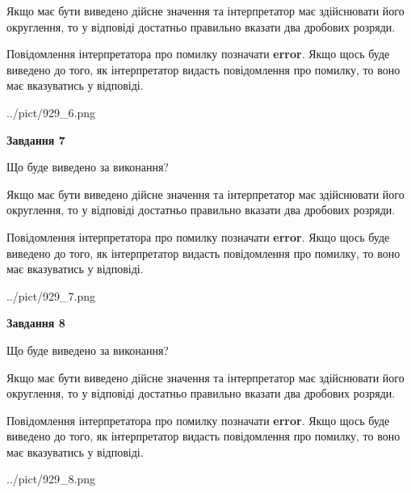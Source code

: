 \documentclass[12pt, ukrainian]{article}
\begin{document}
{\begin {Large}
Якщо має бути виведено дійсне значення та інтерпретатор має здійснювати його округлення, 
то у відповіді достатньо правильно вказати два дробових розряди.

Повідомлення інтерпретатора про помилку позначати \textbf{error}.
Якщо щось буде виведено до того, як інтерпретатор видасть повідомлення про помилку, 
то воно має вказуватись у відповіді. \par

\begin{center}
	{../pict/929_6.png}
\end{center}
\newpage

{\begin {center}\textbf{Завдання 7}\end {center}}\par
Що буде виведено за виконання? \par

Якщо має бути виведено дійсне значення та інтерпретатор має здійснювати його округлення, 
то у відповіді достатньо правильно вказати два дробових розряди.

Повідомлення інтерпретатора про помилку позначати \textbf{error}.
Якщо щось буде виведено до того, як інтерпретатор видасть повідомлення про помилку, 
то воно має вказуватись у відповіді. \par

\begin{center}
	{../pict/929_7.png}
\end{center}
\newpage

{\begin {center}\textbf{Завдання 8}\end {center}}\par
Що буде виведено за виконання? \par

Якщо має бути виведено дійсне значення та інтерпретатор має здійснювати його округлення, 
то у відповіді достатньо правильно вказати два дробових розряди.

Повідомлення інтерпретатора про помилку позначати \textbf{error}.
Якщо щось буде виведено до того, як інтерпретатор видасть повідомлення про помилку, 
то воно має вказуватись у відповіді. \par

\begin{center}
	{../pict/929_8.png}
\end{center}
\newpage


\end{Large}}
\end{document}
